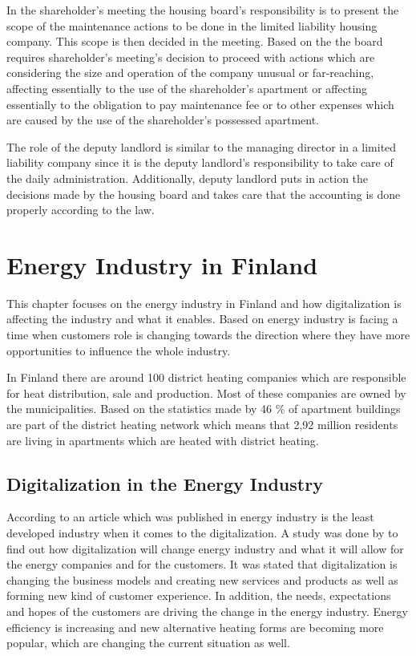 In the shareholder's meeting the housing board's responsibility is to present the scope of the maintenance actions to be done in the limited liability housing company. This scope is then decided in the meeting. \parencite{RantanenViiala:2015} Based on the \textcite{LLHA:2} the board requires shareholder's meeting's decision to proceed with actions which are considering the size and operation of the company unusual or far-reaching, affecting essentially to the use of the shareholder's apartment or affecting essentially to the obligation to pay maintenance fee or to other expenses which are caused by the use of the shareholder's possessed apartment.

The role of the deputy landlord is similar to the managing director in a limited liability company since it is the deputy landlord's responsibility to take care of the daily administration.  Additionally, deputy landlord puts in action the decisions made by the housing board and takes care that the accounting is done properly according to the law. \parencite{Sarekoski:2015}

\section{Energy Industry in Finland}

This chapter focuses on the energy industry in Finland and how digitalization is affecting the industry and what it enables. Based on \textcite{Energiateollisuus:2018} energy industry is facing a time when customers role is changing towards the direction where they have more opportunities to influence the whole industry.

In Finland there are around 100 district heating companies which are responsible for heat distribution, sale and production. Most of these companies are owned by the municipalities. \parencite{Energyindustry:2019,Poyry:2018} Based on the statistics made by \textcite{Energyindustrygraphs:2018} 46 \% of apartment buildings are part of the district heating network which means that 2,92 million residents are living in apartments which are heated with district heating.

\subsection{Digitalization in the Energy Industry}

According to an article which was published in \parencite{Energiauutiset:2016} energy industry is the least developed industry when it comes to the digitalization. A study was done by \textcite{Deloitte} to find out how digitalization will change energy industry and what it will allow for the energy companies and for the customers. It was stated that digitalization is changing the business models and creating new services and products as well as forming new kind of customer experience. In addition, the needs, expectations and hopes of the customers are driving the change in the energy industry. Energy efficiency is increasing and new alternative heating forms are becoming more popular, which are changing the current situation as well. \parencite{Energiateollisuus:2018}

